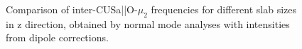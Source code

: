 \documentclass[11pt,DIV=13,BCOR=5mm,a4paper,headinclude]{scrbook}
\begin{document}
\begin{figure}[!h]
    \centering
             \quad
             \quad
             \caption{Comparison of inter-CUSa||O-$\mu_2$ frequencies for different slab sizes in z direction, obtained by normal mode analyses with intensities from dipole corrections.}
            \label{abb:iCa2_size_comp}
\end{figure}
\end{document}
